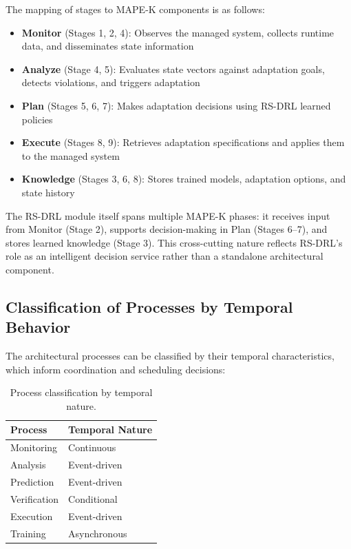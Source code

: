 \documentclass[11pt,a4paper]{article}
\begin{document}
The mapping of stages to MAPE-K components is as follows:

\begin{itemize}
    \item \textbf{Monitor} (Stages 1, 2, 4): Observes the managed system, collects runtime data, and disseminates state information
    \item \textbf{Analyze} (Stage 4, 5): Evaluates state vectors against adaptation goals, detects violations, and triggers adaptation
    \item \textbf{Plan} (Stages 5, 6, 7): Makes adaptation decisions using RS-DRL learned policies
    \item \textbf{Execute} (Stages 8, 9): Retrieves adaptation specifications and applies them to the managed system
    \item \textbf{Knowledge} (Stages 3, 6, 8): Stores trained models, adaptation options, and state history
\end{itemize}

The RS-DRL module itself spans multiple MAPE-K phases: it receives input from Monitor (Stage 2), supports decision-making in Plan (Stages 6--7), and stores learned knowledge (Stage 3). This cross-cutting nature reflects RS-DRL's role as an intelligent decision service rather than a standalone architectural component.

\subsection{Classification of Processes by Temporal Behavior}
\label{subsec:temporal-classification}

The architectural processes can be classified by their temporal characteristics, which inform coordination and scheduling decisions:

\begin{table}[H]
\centering
\begin{tabular}{ll}
\textbf{Process} & \textbf{Temporal Nature} \\
\hline
Monitoring & Continuous \\
Analysis & Event-driven \\
Prediction & Event-driven \\
Verification & Conditional \\
Execution & Event-driven \\
Training & Asynchronous \\
\end{tabular}
\caption{Process classification by temporal nature.}
\label{tab:process-classification}
\end{table}
\end{document}
